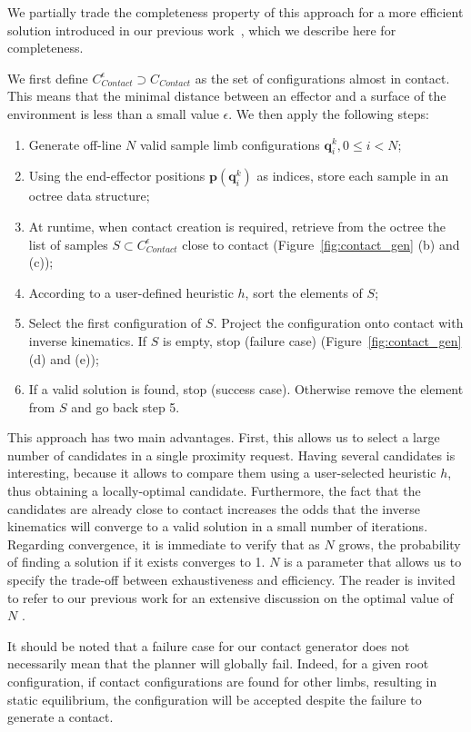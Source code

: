 We partially trade the completeness property of this approach for a more efficient solution introduced in our previous work~\citep{Tonneau2014}, which we describe
here for completeness.

We first define $C_{Contact}^{\epsilon} \supset C_{Contact}$ as the set of configurations almost in contact. This means that the minimal distance 
between an effector and a surface of the environment is less than a small value $\epsilon$.
We then apply the following steps:
\begin{enumerate}
\item Generate off-line $N$ valid sample limb configurations $\mathbf{q}^k_i,  0 \leq i < N$;
\item Using the end-effector positions $\mathbf{p}(\mathbf{q}^k_i)$ as indices, store each sample in an octree data structure;
\item At runtime, when contact creation is required, retrieve from the octree the list of samples $S \subset C_{Contact}^{\epsilon}$ close to contact (Figure~\ref{fig:contact_gen} (b) and (c));
\item According to a user-defined heuristic $h$, sort the elements of $S$;
\item Select the first configuration of $S$. Project the configuration onto contact with inverse kinematics. If $S$ is empty, stop (failure case) (Figure~\ref{fig:contact_gen} (d) and (e));
\item If a valid solution is found, stop (success case). Otherwise remove the element from $S$ and go back step 5.
\end{enumerate}

This approach has two main advantages.
First, this allows us to select a large number of candidates in a single proximity request.
Having several candidates is interesting, because it allows to compare them using a user-selected heuristic $h$, thus obtaining
a locally-optimal candidate.
Furthermore, the fact that the candidates are already close to contact increases the odds that the inverse kinematics will converge to a valid solution in a small number of iterations.
Regarding convergence, it is immediate to verify that as $N$ grows, the probability of finding a solution if it exists converges to 1.
$N$ is a parameter that allows us to specify the trade-off between exhaustiveness and efficiency.
The reader is invited to refer to our previous work for an extensive discussion on the optimal value of $N$ \citep{Tonneau2014}.

It should be noted that a failure case for our contact generator does not necessarily mean that the planner will globally fail. Indeed,
for a given root configuration, if contact configurations are found for other limbs, resulting in static equilibrium, the configuration will be accepted despite
the failure to generate a contact.

